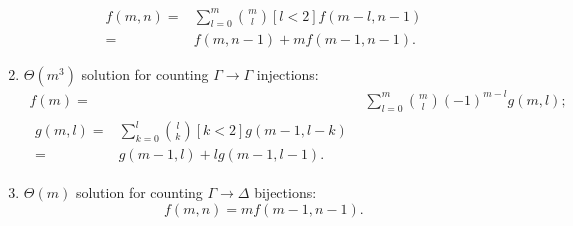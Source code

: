 \documentclass{article}
\theoremstyle{definition}
\begin{document}
\begin{enumerate}
  \begin{align*}
    f(m, n) ={}& \sum_{l=0}^m \binom{m}{l} [l<2] f(m-l, n-1)\\
    ={}& f(m, n-1) + mf(m-1, n-1).
  \end{align*}
  \item $\Theta(m^{3})$ solution for counting $\Gamma \to \Gamma$ injections:
  \begin{align*}
    f(m) ={}& \sum_{l=0}^{m} \binom{m}{l} {(-1)}^{m-l} g(m, l); \\
    \begin{split}
      g(m, l) ={}& \sum_{k=0}^{l} \binom{l}{k} [k < 2] g(m - 1, l - k)\\
      ={}& g(m - 1, l) + lg(m - 1, l - 1).
    \end{split}
  \end{align*}
  \item $\Theta(m)$ solution for counting $\Gamma \to \Delta$ bijections:
  \[
    f(m, n) = mf(m-1, n-1).
  \]
\end{enumerate}





\end{document}
